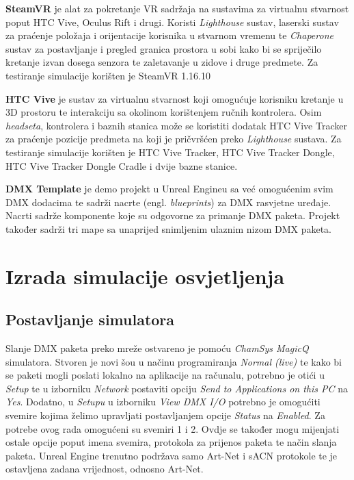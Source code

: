 \documentclass[times, utf8, zavrsni, numeric]{fer}
\begin{document}
\textbf{SteamVR} \cite{SteamVR} je alat za pokretanje VR sadržaja na sustavima za virtualnu stvarnost poput HTC Vive, Oculus Rift i drugi. Koristi \emph{Lighthouse} sustav, laserski sustav za praćenje položaja i orijentacije korisnika u stvarnom vremenu te \emph{Chaperone} sustav za postavljanje i pregled granica prostora u sobi kako bi se spriječilo kretanje izvan dosega senzora te zaletavanje u zidove i druge predmete.
Za testiranje simulacije korišten je SteamVR 1.16.10\newline

\textbf{HTC Vive} \cite{HTC_Vive} je sustav za virtualnu stvarnost koji omogućuje korisniku kretanje u 3D prostoru te interakciju sa okolinom korištenjem ručnih kontrolera. Osim \emph{headseta}, kontrolera i baznih stanica može se koristiti dodatak HTC Vive Tracker za praćenje pozicije predmeta na koji je pričvršćen preko \emph{Lighthouse} sustava.
Za testiranje simulacije korišten je HTC Vive Tracker, HTC Vive Tracker Dongle, HTC Vive Tracker Dongle Cradle i dvije bazne stanice.\newline

\textbf{DMX Template} \cite{dmx_template} je demo projekt u Unreal Engineu sa već omogućenim svim DMX dodacima te sadrži nacrte (engl. \emph{blueprints}) za DMX rasvjetne uređaje. Nacrti sadrže komponente koje su odgovorne za primanje DMX paketa. Projekt također sadrži tri mape sa unaprijed snimljenim ulaznim nizom DMX paketa.

\chapter{Izrada simulacije osvjetljenja}

\section{Postavljanje simulatora}
Slanje DMX paketa preko mreže ostvareno je pomoću \emph{ChamSys MagicQ} simulatora. Stvoren je novi šou u načinu programiranja \emph{Normal (live)} te kako bi se paketi mogli poslati lokalno na aplikacije na računalu, potrebno je otići u \emph{Setup} te u izborniku \emph{Network} postaviti opciju \emph{Send to Applications on this PC} na \emph{Yes}. Dodatno, u \emph{Setupu} u izborniku \emph{View DMX I/O} potrebno je omogućiti svemire kojima želimo upravljati postavljanjem opcije \emph{Status} na \emph{Enabled}. Za potrebe ovog rada omogućeni su svemiri 1 i 2. Ovdje se također mogu mijenjati ostale opcije poput imena svemira, protokola za prijenos paketa te način slanja paketa. Unreal Engine trenutno podržava samo Art-Net i sACN protokole te je ostavljena zadana vrijednost, odnosno Art-Net.\newline
\end{document}

